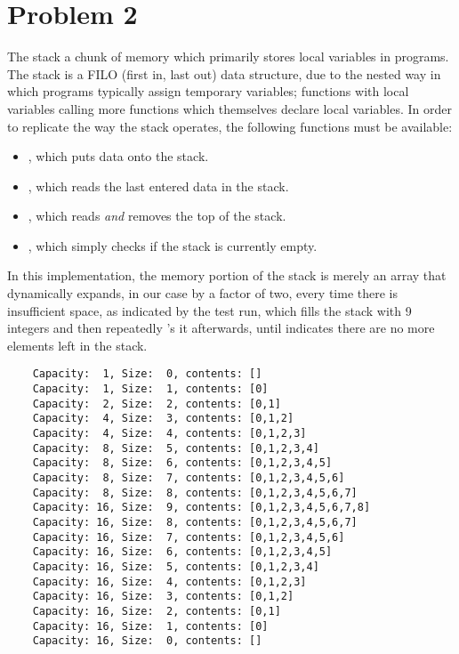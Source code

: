 \section*{Problem 2}
The stack a chunk of memory which primarily stores local variables in programs.
The stack is a FILO (first in, last out) data structure, due to the nested way in which programs typically assign temporary variables; functions with local variables calling more functions which themselves declare local variables. 
In order to replicate the way the stack operates, the following functions must be available:

\begin{itemize}
\item {}, which puts data onto the stack.
\item {}, which reads the last entered data in the stack.
\item {}, which reads \textit{and} removes the top of the stack.
\item {}, which simply checks if the stack is currently empty.
\end{itemize}

In this implementation, the memory portion of the stack is merely an array that dynamically expands, in our case by a factor of two, every time there is insufficient space, as indicated by the test run, which fills the stack with 9 integers and then repeatedly 's it afterwards, until  indicates there are no more elements left in the stack.

\begin{verbatim}
    Capacity:  1, Size:  0, contents: []
    Capacity:  1, Size:  1, contents: [0]
    Capacity:  2, Size:  2, contents: [0,1]
    Capacity:  4, Size:  3, contents: [0,1,2]
    Capacity:  4, Size:  4, contents: [0,1,2,3]
    Capacity:  8, Size:  5, contents: [0,1,2,3,4]
    Capacity:  8, Size:  6, contents: [0,1,2,3,4,5]
    Capacity:  8, Size:  7, contents: [0,1,2,3,4,5,6]
    Capacity:  8, Size:  8, contents: [0,1,2,3,4,5,6,7]
    Capacity: 16, Size:  9, contents: [0,1,2,3,4,5,6,7,8]
    Capacity: 16, Size:  8, contents: [0,1,2,3,4,5,6,7]
    Capacity: 16, Size:  7, contents: [0,1,2,3,4,5,6]
    Capacity: 16, Size:  6, contents: [0,1,2,3,4,5]
    Capacity: 16, Size:  5, contents: [0,1,2,3,4]
    Capacity: 16, Size:  4, contents: [0,1,2,3]
    Capacity: 16, Size:  3, contents: [0,1,2]
    Capacity: 16, Size:  2, contents: [0,1]
    Capacity: 16, Size:  1, contents: [0]
    Capacity: 16, Size:  0, contents: []
\end{verbatim}

